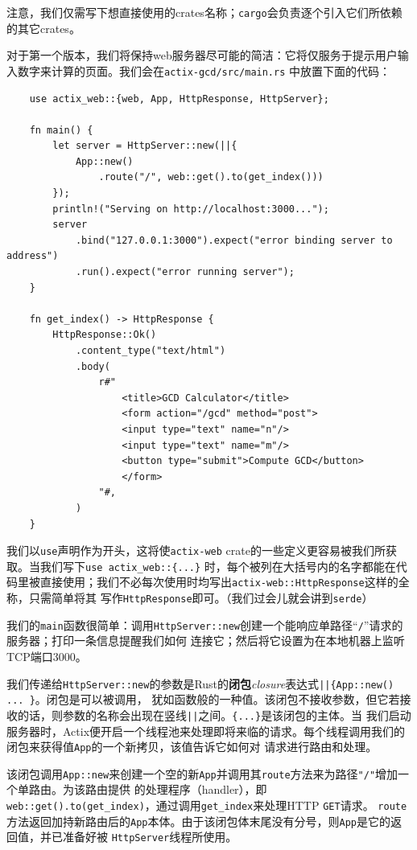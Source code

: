 \medskip
注意，我们仅需写下想直接使用的crates名称；\texttt{cargo}会负责逐个引入它们所依赖的其它crates。

\medskip
对于第一个版本，我们将保持web服务器尽可能的简洁：它将仅服务于提示用户输入数字来计算的页面。我们会在\texttt{actix-gcd/src/main.rs}
中放置下面的代码：
\begin{verbatim}
    use actix_web::{web, App, HttpResponse, HttpServer};    

    fn main() {
        let server = HttpServer::new(||{
            App::new()
                .route("/", web::get().to(get_index()))
        });
        println!("Serving on http://localhost:3000...");
        server
            .bind("127.0.0.1:3000").expect("error binding server to address")
            .run().expect("error running server");
    }

    fn get_index() -> HttpResponse {
        HttpResponse::Ok()
            .content_type("text/html")
            .body(
                r#"
                    <title>GCD Calculator</title>
                    <form action="/gcd" method="post">
                    <input type="text" name="n"/>
                    <input type="text" name="m"/>
                    <button type="submit">Compute GCD</button>
                    </form>
                "#,
            )
    }
\end{verbatim}

\smallskip
我们以\texttt{use}声明作为开头，这将使\texttt{actix-web} crate的一些定义更容易被我们所获取。当我们写下\texttt{use actix\_web::\{...\}}
时，每个被列在大括号内的名字都能在代码里被直接使用；我们不必每次使用时均写出\texttt{actix-web::HttpResponse}这样的全称，只需简单将其
写作\texttt{HttpResponse}即可。（我们过会儿就会讲到\texttt{serde}）

\medskip
我们的\texttt{main}函数很简单：调用\texttt{HttpServer::new}创建一个能响应单路径``\texttt{/}''请求的服务器；打印一条信息提醒我们如何
连接它；然后将它设置为在本地机器上监听TCP端口3000。

\medskip
我们传递给\texttt{HttpServer::new}的参数是Rust的\textbf{闭包}\textit{closure}表达式\texttt{||\{App::new() ... \}}。闭包是可以被调用，
犹如函数般的一种值。该闭包不接收参数，但它若接收的话，则参数的名称会出现在竖线\texttt{||}之间。\texttt{\{...\}}是该闭包的主体。当
我们启动服务器时，Actix便开启一个线程池来处理即将来临的请求。每个线程调用我们的闭包来获得值\texttt{App}的一个新拷贝，该值告诉它如何对
请求进行路由和处理。

\medskip
该闭包调用\texttt{App::new}来创建一个空的新\texttt{App}并调用其\texttt{route}方法来为路径\texttt{"/"}增加一个单路由。为该路由提供
的处理程序（handler），即\texttt{web::get().to(get\_index)}，通过调用\texttt{get\_index}来处理HTTP \texttt{GET}请求。
\texttt{route}方法返回加持新路由后的\texttt{App}本体。由于该闭包体末尾没有分号，则\texttt{App}是它的返回值，并已准备好被
\texttt{HttpServer}线程所使用。

